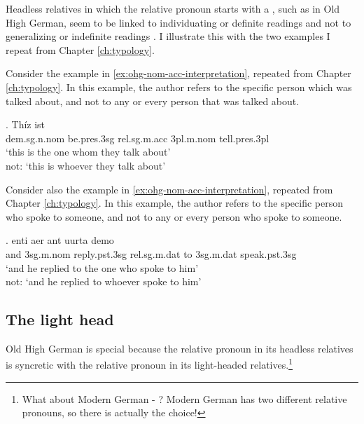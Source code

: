 Headless relatives in which the relative pronoun starts with a , such as in Old High German, seem to be linked to individuating or definite readings and not to generalizing or indefinite readings \citep[cf.][]{fuss2017}. I illustrate this with the two examples I repeat from Chapter  \ref{ch:typology}.

Consider the example in \ref{ex:ohg-nom-acc-interpretation}, repeated from Chapter \ref{ch:typology}.
In this example, the author refers to the specific person which was talked about, and not to any or every person that was talked about.

\exg. Thíz ist   \\
\ac{dem}.\ac{sg}.\ac{n}.\ac{nom} be.\ac{pres}.3\ac{sg}\scsub{[nom]} \ac{rel}.\ac{sg}.\ac{m}.\ac{acc}
3\ac{pl}.\ac{m}.\ac{nom} tell.\ac{pres}.3\ac{pl}\scsub{[acc]}\\
`this is the one whom they talk about'\\
not: `this is whoever they talk about' \label{ex:ohg-nom-acc-interpretation}

Consider also the example in \ref{ex:ohg-nom-acc-interpretation}, repeated from Chapter \ref{ch:typology}.
In this example, the author refers to the specific person who spoke to someone, and not to any or every person who spoke to someone.

\exg. enti aer {ant uurta} demo  \\
and 3\ac{sg}.\ac{m}.\ac{nom} reply.\ac{pst}.3\ac{sg}\scsub{[dat]} \ac{rel}.\ac{sg}.\ac{m}.\ac{dat} {to 3\ac{sg}.\ac{m}.\ac{dat}} speak.\ac{pst}.3\ac{sg}\scsub{[nom]}\\
`and he replied to the one who spoke to him'\\
not: `and he replied to whoever spoke to him'
 \label{ex:ohg-dat-nom-rep}

\subsection{The light head}

Old High German is special because the relative pronoun in its headless relatives is syncretic with the relative pronoun in its light-headed relatives.\footnote{
What about Modern German  - ? Modern German has two different relative pronouns, so there is actually the choice!
}


